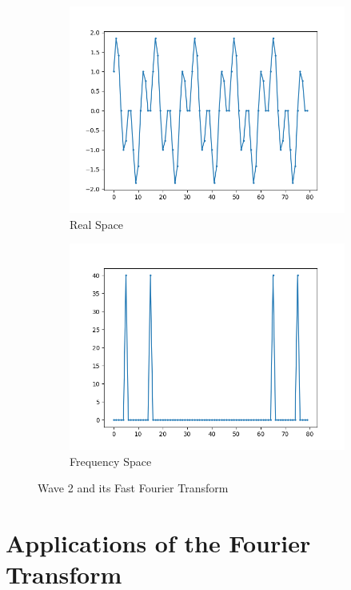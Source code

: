 \documentclass{amsproc}
\begin{document}
\begin{figure}[h]
\centering
\begin{subfigure}{.4\textwidth}
	\centering
	\includegraphics[scale=.3]{FFTOriginal2.png}
	\caption{Real Space}
	\label{fig:sub3}
\end{subfigure} %
\begin{subfigure}{.4\textwidth}
	\centering
	\includegraphics[scale=.3]{FFTResult2.png}
	\caption{Frequency Space}
	\label{fig:sub4}
\end{subfigure}
\caption{Wave 2 and its Fast Fourier Transform}
\label{fig:text2}
\end{figure}
\section{Applications of the Fourier Transform}
\end{document}
